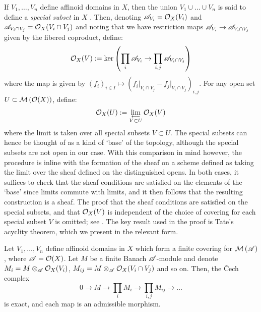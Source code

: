 If $V_1, \dots, V_n$ define affinoid domains in $X$, then the union $V_1 \cup \dots \cup V_n$ is said to define a \textit{special subset} in $X$ \parencite[\S 2.2]{berk1}. 
Then, denoting $\mathscr{A}_{V_i} = \mathcal{O}_{X}(V_i)$ and $\mathscr{A}_{V_i \cap V_j} = \mathcal{O}_{X}(V_i \cap V_j)$ and noting that we have restriction maps $\mathscr{A}_{V_i} \to \mathscr{A}_{V_i \cap V_j}$ given by the fibered coproduct, define:
\[
\mathcal{O}_X(V) := \ker\left(\prod_{i} \mathscr{A}_{V_i} \to \prod_{i, j} \mathscr{A}_{V_i \cap V_j}  \right)
\]
where the map is given by $(f_i)_{i \in I} \mapsto (f_i \vert_{V_i \cap V_j} - f_j \vert_{V_i \cap V_j})_{i, j}$.
For any open set $U \subset \mathcal{M}\left(\mathcal{O}(X)\right)$, define:
\[
\mathcal{O}_{X}(U) := \lim\limits_{\substack{\longleftarrow \\ V \subset U} } \mathcal{O}_X(V)
\]
where the limit is taken over all special subsets $V \subset U$. The special subsets can hence be thought of as a kind of `base' of the topology, although the special subsets are not open in our case. 
With this comparison in mind however, the procedure is inline with the formation of the sheaf on a scheme defined as taking the limit over the sheaf defined on the distinguished opens. 
In both cases, it suffices to check that the sheaf conditions are satisfied on the elements of the `base' since limits commute with limits, and it then follows that the resulting construction is a sheaf. 
The proof that the sheaf conditions are satisfied on the special subsets, and that $\mathcal{O}_{X}(V)$ is independent of the choice of covering for each special subset $V$ is omitted; see \parencite[Corollary 2.2.6]{berk1}. 
The key result used in the proof is Tate's acyclity theorem, which we present in the relevant form.

\begin{theorem} \parencite[\S 8.2.2]{bgr}
    Let $V_1, \dots, V_n$ define affinoid domains in $X$ which form a finite covering for $\mathcal{M}\left(\mathscr{A}\right)$, where $\mathscr{A} = \mathcal{O}(X)$.
    Let $M$ be a finite Banach $\mathscr{A}$-module and denote ${M_i = M \otimes_{\mathscr{A}} \mathcal{O}_X(V_i)}$, ${M_{i j} = M \otimes_{\mathscr{A}} \mathcal{O}_X(V_i \cap V_j)}$ and so on.
    Then, the {\v C}ech complex
    \[
        0 \to M \to \prod_{i} M_i \to \prod_{i, j} M_{i j} \to \dots
    \]
    is exact, and each map is an admissible morphism.
\end{theorem}

